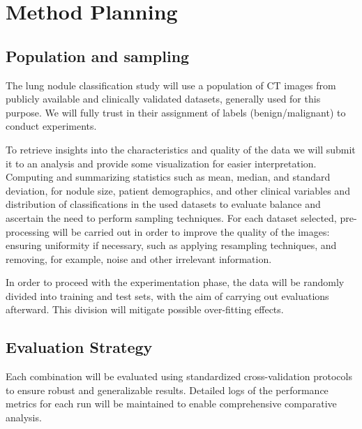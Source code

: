 \chapter{Method Planning }\label{chap:chap4}

        
\section{Population and sampling}
    The lung nodule classification study will use a population of CT images from publicly available and clinically validated datasets, generally used for this purpose. We will fully trust in their assignment of labels (benign/malignant) to conduct experiments. 
    
    To retrieve insights into the characteristics and quality of the data we will submit it to an analysis and provide some visualization for easier interpretation. Computing and summarizing statistics such as mean, median, and standard deviation, for nodule size, patient demographics, and other clinical variables and distribution of classifications in the used datasets to evaluate balance and ascertain the need to perform sampling techniques. For each dataset selected, pre-processing will be carried out in order to improve the quality of the images: ensuring uniformity if necessary, such as applying resampling techniques, and removing, for example, noise and other irrelevant information.
    
    In order to proceed with the experimentation phase, the data will be randomly divided into training and test sets, with the aim of carrying out evaluations afterward. This division will mitigate possible over-fitting effects.
        
\section{Evaluation Strategy}
Each combination will be evaluated using standardized cross-validation protocols to ensure robust and generalizable results. Detailed logs of the performance metrics for each run will be maintained to enable comprehensive comparative analysis.

